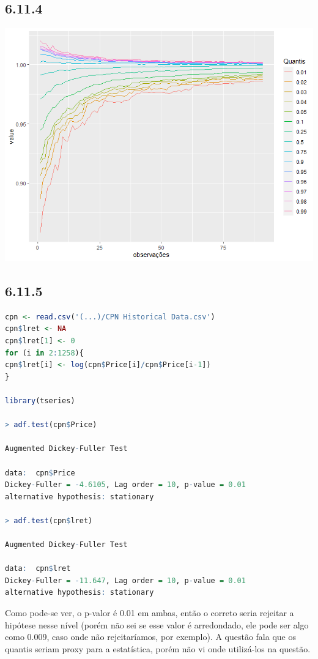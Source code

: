 \documentclass[12pt]{article}
\begin{document}
\subsection*{6.11.4}

\begin{center}
	\includegraphics*[scale=0.7]{3.png}
\end{center}

\subsection*{6.11.5}
\begin{lstlisting}[language=R]
cpn <- read.csv('(...)/CPN Historical Data.csv')
cpn$lret <- NA
cpn$lret[1] <- 0
for (i in 2:1258){
cpn$lret[i] <- log(cpn$Price[i]/cpn$Price[i-1])
}

library(tseries)

> adf.test(cpn$Price)

Augmented Dickey-Fuller Test

data:  cpn$Price
Dickey-Fuller = -4.6105, Lag order = 10, p-value = 0.01
alternative hypothesis: stationary

> adf.test(cpn$lret)

Augmented Dickey-Fuller Test

data:  cpn$lret
Dickey-Fuller = -11.647, Lag order = 10, p-value = 0.01
alternative hypothesis: stationary
\end{lstlisting}
Como pode-se ver, o p-valor é 0.01 em ambas, então o correto seria rejeitar a hipótese nesse nível (porém não sei se esse valor é arredondado, ele pode ser algo como 0.009, caso onde não rejeitaríamos, por exemplo). A questão fala que os quantis seriam proxy para a estatística, porém não vi onde utilizá-los na questão.
\end{document}
